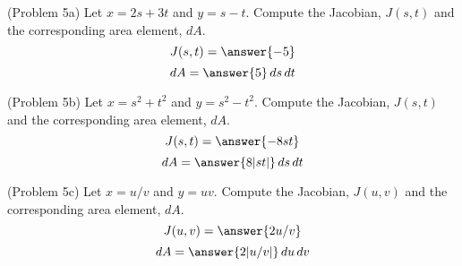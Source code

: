 \documentclass[handout]{ximera}
\begin{document}
\begin{problem}(Problem 5a)
Let $x = 2s + 3t$ and $y = s - t$. Compute the Jacobian, $J(s, t)$ and the corresponding area element, $dA$.\\
\[
J(s,t) = \answer{-5}
\]
\[
dA = \answer{5}\, ds\, dt
\]
\end{problem}

\begin{problem}(Problem 5b)
Let $x = s^2 + t^2$ and $y = s^2 - t^2$. Compute the Jacobian, $J(s, t)$ and the corresponding area element, $dA$.\\
\[
J(s,t) = \answer{-8st}
\]
\[
dA = \answer{8|st|}\, ds\, dt
\]
\end{problem}

\begin{problem}(Problem 5c)
Let $x = u/v$ and $y = uv$. Compute the Jacobian, $J(u,v)$ and the corresponding area element, $dA$.\\
\[
J(u,v) = \answer{2u/v}
\]
\[
dA = \answer{2|u/v|}\, du\, dv
\]
\end{problem}
\end{document}
